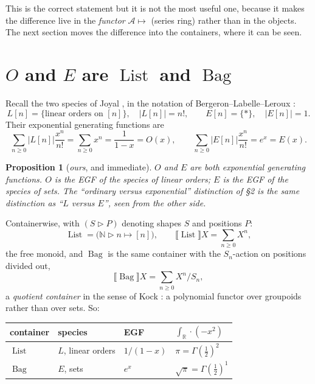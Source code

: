 \documentclass[11pt,a4paper]{article}
\newtheorem{proposition}[theorem]{Proposition}
\theoremstyle{definition}
\theoremstyle{remark}
\newcommand{\NN}{\mathbb{N}}
\newcommand{\RR}{\mathbb{R}}
\newcommand{\con}{\mathrel{\vartriangleright}}
\newcommand{\norm}[1]{\lvert #1 \rvert}
\DeclareMathOperator{\Bag}{Bag}
\DeclareMathOperator{\List}{List}
\begin{document}
This is the correct statement but it is not the most useful one, because it makes the
difference live in the \emph{functor}
$\mathcal{A} \mapsto {}$ (series ring) rather than in the objects. The next section
moves the difference into the containers, where it can be seen.

\section{$O$ and $E$ are $\List$ and $\Bag$}

Recall the two species of Joyal \cite{Joyal81}, in the notation of
Bergeron--Labelle--Leroux \cite{BLL}:
\[
  L[n] = \{\text{linear orders on } [n]\},\quad \norm{L[n]} = n!,
  \qquad
  E[n] = \{\ast\},\quad \norm{E[n]} = 1 .
\]
Their exponential generating functions are
\[
  \sum_{n\ge0} \norm{L[n]}\frac{x^n}{n!} = \sum_{n\ge 0} x^n = \frac{1}{1-x} = O(x),
  \qquad
  \sum_{n\ge0} \norm{E[n]}\frac{x^n}{n!} = e^x = E(x).
\]

\begin{proposition}[\emph{ours}, and immediate]\label{prop:listbag}
$O$ and $E$ are both exponential generating functions. $O$ is the EGF of the species
of linear orders; $E$ is the EGF of the species of sets. The ``ordinary versus
exponential'' distinction of \S2 is the same distinction as ``$L$ versus $E$'', seen
from the other side.
\end{proposition}

Containerwise, with $(S \con P)$ denoting shapes $S$ and positions $P$:
\[
  \List = \bigl(\NN \con n \mapsto [n]\bigr), \qquad
  \llbracket \List \rrbracket X = \sum_{n\ge 0} X^{n},
\]
the free monoid, and $\Bag$ is the same container with the $S_n$-action on positions
divided out,
\[
  \llbracket \Bag \rrbracket X = \sum_{n \ge 0} X^{n}/S_n ,
\]
a \emph{quotient container} in the sense of Kock \cite{Kock}: a polynomial functor
over groupoids rather than over sets. So:

\begin{center}
\small
\begin{tabular}{@{}llll@{}}
\toprule
container & species & EGF & $\int_\RR \cdot(-x^2)$ \\
\midrule
$\List$ & $L$, linear orders & $1/(1-x)$ & $\pi = \Gamma(\tfrac12)^2$ \\
$\Bag$ & $E$, sets & $e^x$ & $\sqrt{\pi} = \Gamma(\tfrac12)^1$ \\
\bottomrule
\end{tabular}
\end{center}
\end{document}
